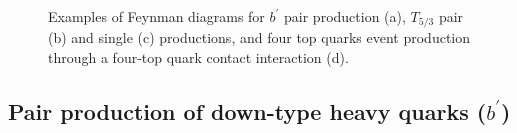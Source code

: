 \begin{figure}[t]
\caption{Examples of Feynman diagrams for $b^\prime$ pair production (a), $T_{5/3}$ pair (b) and
single (c) productions, and four top quarks event production through a four-top quark contact interaction (d).}
\end{figure}


\subsection{Pair production of down-type heavy quarks ($b^\prime$)}

